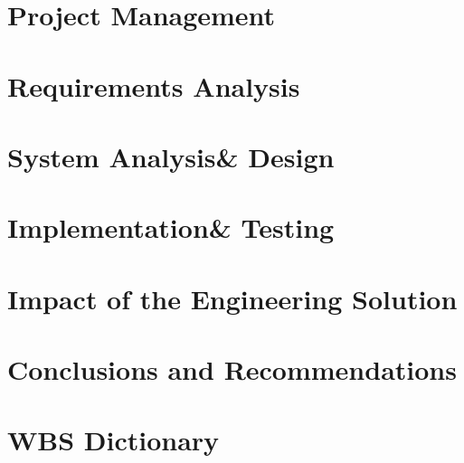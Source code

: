\documentclass{aurak-sdp}
\begin{document}
\chapter[Project Management]{Project Management}


\chapter[Requirements Analysis]{Requirements Analysis}


\chapter[System Analysis \& Design]{System Analysis\break\& Design}


\chapter[Implementation \& Testing]{Implementation\break\& Testing}


\chapter[Impact of the Engineering Solution]{Impact of the Engineering Solution}


\chapter[Conclusions and Recommendations]{Conclusions and Recommendations}


\bibchapter
\begin{chapterpage}
\end{chapterpage}\pagestyle{bib}
{
\raggedright %
\nocite{*}
\printbibliography[category=cited,heading=none]
}

\frchapter %
\begin{chapterpage}
\end{chapterpage}\pagestyle{fr}%
{
\raggedright
\printbibliography[notcategory=cited,heading=none]
}

\appendix
\setcounter{chapter}{3} %
\chapter{WBS Dictionary}\label{dict}
\begin{chapterpage}
\end{chapterpage}

\end{document}
